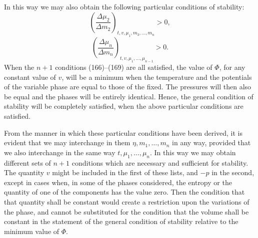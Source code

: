 \documentclass[11pt]{article}
\newcommand{\D}{\Delta}
\begin{document}
In this way we may also obtain the following particular conditions of stability:
\begin{equation}
\left(\frac{\D\mu_2}{\D m_2}\right)_{t,v,\mu_1,m_3,\ldots,m_n}>0,
\end{equation}
\begin{equation}
\left(\frac{\D\mu_n}{\D m_n}\right)_{t,v,\mu_1,\ldots,\mu_{n-1}}>0.
\end{equation}
When the $n+1$ conditions (166)--(169) are all satisfied, the value of $\Phi$, for any constant value of $v$, will be a minimum when the temperature and the potentials of the variable phase are equal to those of the fixed. The pressures will then also be equal and the phases will be entirely identical. Hence, the general condition of stability will be completely satisfied, when the above particular conditions are satisfied.

From the manner in which these particular conditions have been derived, it is evident that we may interchange in them $\eta,m_1,\ldots,m_n$ in any way, provided that we also interchange in the same way $t,\mu_1,\ldots,\mu_n$. In this way we may obtain different sets of $n+1$ conditions which are necessary and sufficient for stability. The quantity $v$ might be included in the first of these lists, and $-p$ in the second, except in cases when, in some of the phases considered, the entropy or the quantity of one of the components has the value zero. Then the condition that that quantity shall be constant would create a restriction upon the variations of the phase, and cannot be substituted for the condition that the volume shall be constant in the statement of the general condition of stability relative to the minimum value of $\Phi$.
\end{document}
